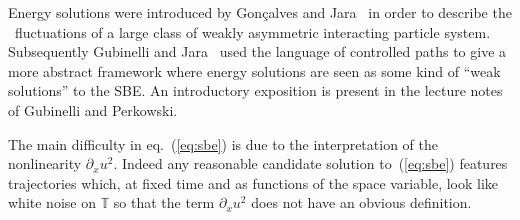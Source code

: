 \documentclass[a4paper,11pt]{article}
\begin{document}
Energy solutions were introduced by Gon{\c c}alves and
Jara~{\cite{goncalves_nonlinear_2013}} in order to describe the \ fluctuations
of a large class of weakly asymmetric interacting particle system.
Subsequently Gubinelli and Jara~{\cite{gubinelli_regularization_2013}} used
the language of controlled paths to give a more abstract framework where
energy solutions are seen as some kind of ``weak solutions'' to the SBE. An
introductory exposition is present in the lecture
notes~{\cite{gubinelli_lectures_2015}} of Gubinelli and Perkowski.

The main difficulty in eq.~(\ref{eq:sbe}) is due to the interpretation of the
nonlinearity $\partial_x u^2$. Indeed any reasonable candidate solution
to~(\ref{eq:sbe}) features trajectories which, at fixed time and as functions
of the space variable, look like white noise on $\mathbb{T}$ so that the term
$\partial_x u^2$ does not have an obvious definition.
\end{document}

